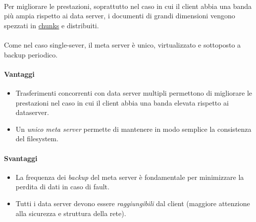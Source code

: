 \documentclass[11pt,a4paper,english]{article}
\begin{document}
\paragraph{} Per migliorare le prestazioni, soprattutto nel caso in cui il client abbia una banda più ampia rispetto ai data server, i documenti di grandi dimensioni vengono spezzati in \underline{chunks} e distribuiti. 

\paragraph{} Come nel caso single-sever, il meta server è unico, virtualizzato e sottoposto a backup periodico. 

\paragraph{Vantaggi} \begin{itemize}
	\item Trasferimenti concorrenti con data server multipli permettono di migliorare le prestazioni nel caso in cui il client abbia una banda elevata rispetto ai dataserver.
	\item Un \emph{unico meta server} permette di mantenere in modo semplice la consistenza del filesystem.
\end{itemize}

\paragraph{Svantaggi} \begin{itemize}
	\item La frequenza dei \emph{backup} del meta server è fondamentale per minimizzare la perdita di dati in caso di fault.
	\item Tutti i data server devono essere \emph{raggiungibili} dal client (maggiore attenzione alla sicurezza e struttura della rete).
\end{itemize}
\end{document}
